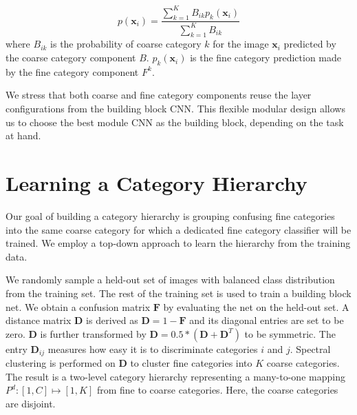\documentclass[10pt,twocolumn,letterpaper]{article}
\begin{document}
\vspace{-0.5em}
\begin{equation}
\label{eqn:final_pred}
p(\mathbf{x}_i)=\frac{\sum_{k=1}^{K}B_{ik}p_{k}(\mathbf{x}_i)}{\sum_{k=1}^{K}B_{ik}}    
\end{equation}
where $B_{ik}$ is the probability of coarse category $k$ for the image $\mathbf{x}_i$ predicted by the coarse category component $B$. $p_{k}(\mathbf{x}_i)$ is the fine category prediction made by the fine category component $F^{k}$.

We stress that both coarse and fine category components reuse the layer configurations from the building block CNN. This flexible modular design allows us to choose the best module CNN as the building block, depending on the task at hand.














\section{Learning a Category Hierarchy}
\label{sec:coarse_category}

Our goal of building a category hierarchy is grouping confusing fine categories into the same coarse category for which a dedicated fine category classifier will be trained. We employ a top-down approach to learn the hierarchy from the training data.

We randomly sample a held-out set of images with balanced class distribution from the training set. The rest of the training set is used to train a building block net.
We obtain a confusion matrix $\mathbf{F}$ by evaluating the net on the held-out set. A distance matrix $\mathbf{D}$ is derived as $\mathbf{D}=1 - \mathbf{F}$ and its diagonal entries are set to be zero. $\mathbf{D}$ is further transformed by $\mathbf{D}=0.5 * (\mathbf{D} + \mathbf{D}^T)$ to be symmetric. The entry $\mathbf{D}_{ij}$ measures how easy it is to discriminate categories $i$ and $j$.
Spectral clustering is performed on $\mathbf{D}$ to cluster fine categories into  $K$ coarse categories. 
The result is a two-level category hierarchy representing a many-to-one mapping $P^d: [1,C] \mapsto [1,K] $ from fine to coarse categories. Here, the coarse categories are disjoint.
\end{document}
